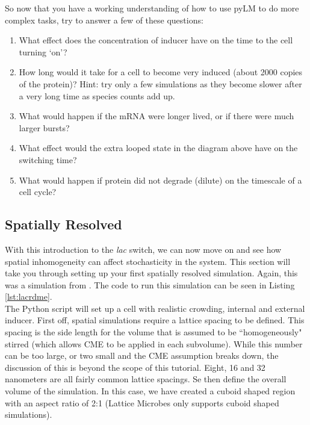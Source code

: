 So now that you have a working understanding of how to use pyLM to do more complex tasks, try to answer a few of these questions:
\begin{enumerate}
\item What effect does the concentration of inducer have on the time to the cell turning `on'?
\item How long would it take for a cell to become very induced (about 2000 copies of the protein)?  Hint: try only a few simulations as they become slower after a very long time as species counts add up.
\item What would happen if the mRNA were longer lived, or if there were much larger bursts?
\item What effect would the extra looped state in the diagram above have on the switching time?
\item What would happen if protein did not degrade (dilute) on the timescale of a cell cycle?
\end{enumerate}


\subsection{Spatially Resolved} \label{sec:lacRDME}
With this introduction to the {\it lac} switch, we can now move on and see how spatial inhomogeneity can affect stochasticity in the system.  This section will take you through setting up your first spatially resolved simulation. Again, this was a simulation from \cite{Roberts2011nci}. The code to run this simulation can be seen in Listing \ref{lst:lacrdme}. \\


 
The Python script will set up a cell with realistic crowding, internal and external inducer.  First off, spatial simulations require a lattice spacing to be defined.  This spacing is the side length for the volume that is assumed to be ``homogeneously" stirred (which allows CME to be applied in each subvolume). While this number can be too large, or two small and the CME assumption breaks down, the discussion of this is beyond the scope of this tutorial.  Eight, 16 and 32 nanometers are all fairly common lattice spacings.  Se then define the overall volume of the simulation.  In this case, we have created a cuboid shaped region with an aspect ratio of 2:1 (Lattice Microbes only supports cuboid shaped simulations).  \\

